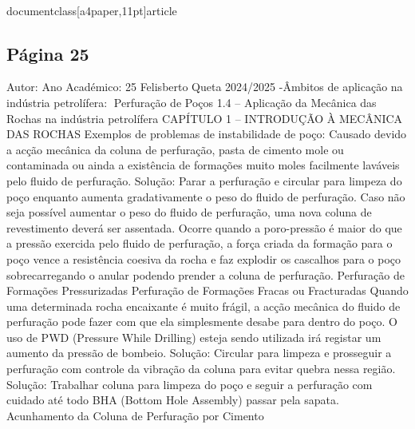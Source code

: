 \\documentclass[a4paper,11pt]{article}
\begin{document}
\subsection*{Página 25}
Autor:
Ano Académico:
25
Felisberto Queta
2024/2025
-Âmbitos de aplicação na indústria petrolífera:
Perfuração de Poços
1.4 – Aplicação da Mecânica das Rochas na indústria petrolífera
CAPÍTULO 1 – INTRODUÇÃO À MECÂNICA DAS ROCHAS
Exemplos de problemas de instabilidade de poço:
Causado devido a acção mecânica 
da coluna de perfuração, pasta de 
cimento mole ou contaminada ou 
ainda a existência de formações 
muito moles facilmente laváveis pelo 
fluido de perfuração.
Solução: Parar a perfuração e circular 
para limpeza do poço enquanto aumenta 
gradativamente o peso do fluido de 
perfuração. Caso não seja possível 
aumentar o peso do fluido de perfuração, 
uma nova coluna de revestimento deverá 
ser assentada.
Ocorre quando a poro-pressão é maior do 
que a pressão exercida pelo fluido de 
perfuração, a força criada da formação 
para o poço vence a resistência coesiva da 
rocha e faz explodir os cascalhos para o 
poço sobrecarregando o anular podendo 
prender a coluna de perfuração.
Perfuração de
Formações
Pressurizadas
Perfuração de
Formações
Fracas ou
Fracturadas
Quando uma determinada rocha encaixante 
é muito frágil, a acção mecânica do fluido de 
perfuração pode fazer com que ela 
simplesmente desabe para dentro do poço. 
O uso de PWD (Pressure While Drilling) 
esteja sendo utilizada irá registar um 
aumento da pressão de bombeio.
Solução: Circular para limpeza e prosseguir 
a perfuração com controle da vibração da 
coluna para evitar quebra nessa região.
Solução: Trabalhar coluna para 
limpeza do poço e seguir a 
perfuração com cuidado até todo 
BHA (Bottom Hole Assembly) passar 
pela sapata.
Acunhamento
da Coluna de
Perfuração por
Cimento 
\end{document}
